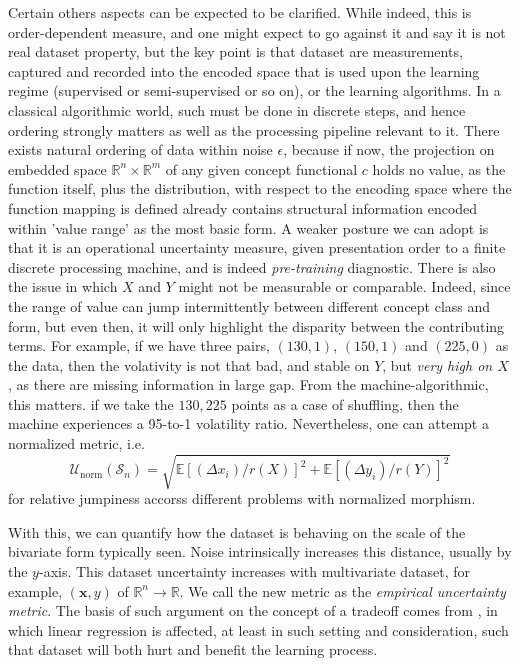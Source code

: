 Certain others aspects can be expected to be clarified. While indeed, this is order-dependent measure, and one might expect to go against it and say it is not real dataset property, but the key point is that dataset are measurements, captured and recorded into the encoded space that is used upon the learning regime (supervised or semi-supervised or so on), or the learning algorithms. In a classical algorithmic world, such must be done in discrete steps, and hence ordering strongly matters as well as the processing pipeline relevant to it. There exists natural ordering of data within noise $\epsilon$, because if now, the projection on embedded space $\mathbb{R}^{n}\times \mathbb{R}^{m}$ of any given concept functional $c$ holds no value, as the function itself, plus the distribution, with respect to the encoding space where the function mapping is defined already contains structural information encoded within 'value range' as the most basic form. A weaker posture we can adopt is that it is an operational uncertainty measure, given presentation order to a finite discrete processing machine, and is indeed \textit{pre-training} diagnostic. There is also the issue in which $X$ and $Y$ might not be measurable or comparable. Indeed, since the range of value can jump intermittently between different concept class and form, but even then, it will only highlight the disparity between the contributing terms. For example, if we have three pairs, $(130,1)$, $(150,1)$ and $(225,0)$ as the data, then the volativity is not that bad, and stable on $Y$, but \textit{very high on $X$}, as there are missing information in large gap. From the machine-algorithmic, this matters. if we take the $130,225$ points as a case of shuffling, then the machine experiences a 95-to-1 volatility ratio. Nevertheless, one can attempt a normalized metric, i.e. 
\begin{equation}
    \mathcal{U}_{\mathrm{norm}}(\mathcal{S}_{n}) = \sqrt{\mathbb{E}[(\Delta x_{i})/r(X)]^{2}+\mathbb{E}[(\Delta y_{i})/r(Y)]^{2}}
\end{equation}
for relative jumpiness accorss different problems with normalized morphism. 

With this, we can quantify how the dataset is behaving on the scale of the bivariate form typically seen. Noise intrinsically increases this distance, usually by the $y$-axis. This dataset uncertainty increases with multivariate dataset, for example, $(\mathbf{x},y)$ of $\mathbb{R}^{n}\to\mathbb{R}$. We call the new metric as the \textit{empirical uncertainty metric}. The basis of such argument on the concept of a tradeoff comes from \cite{nakkiran2019datahurtlinearregression}, in which linear regression is affected, at least in such setting and consideration, such that dataset will both hurt and benefit the learning process. 

